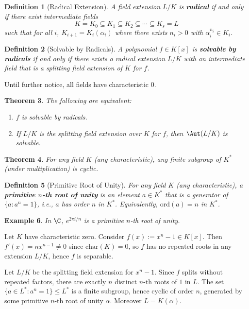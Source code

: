 \documentclass[a4paper,12pt]{article}
\newtheorem{thm}{Theorem}[section]
\newtheorem{defn}[thm]{Definition}
\newtheorem{eg}[thm]{Example}
\begin{document}
\begin{defn}[Radical Extension]
    A field extension $L/K$ is \textbf{radical} if and only if there exist intermediate fields
    \[
    K=K_0\subseteq K_1\subseteq K_2\subseteq \cdots \subseteq K_s=L
    \]
    such that for all $i$, $K_{i+1}=K_i(\alpha_i)$ where there exists $n_i>0$ with $\alpha_i^{n_i}\in K_i$.
\end{defn}

\begin{defn}[Solvable by Radicals]
    A polynomial $f\in K[x]$ is \textbf{solvable by radicals} if and only if there exists a radical extension $L/K$ with an intermediate field that is a splitting field extension of $K$ for $f$.
\end{defn}

Until further notice, all fields have characteristic $0$.

\begin{thm}
    The following are equivalent:
    \begin{enumerate}
        \item $f$ is solvable by radicals.
        \item If $L/K$ is the splitting field extension over $K$ for $f$, then $\Aut(L/K)$ is solvable.
    \end{enumerate}
\end{thm}

\begin{thm}
    For any field $K$ (any characteristic), any finite subgroup of $K^*$ (under multiplication) is cyclic.
\end{thm}

\begin{defn}[Primitive Root of Unity]
    For any field $K$ (any characteristic), a \textbf{primitive $n$-th root of unity} is an element $a\in K^*$ that is a generator of $\{a : a^n=1\}$, i.e., $a$ has order $n$ in $K^*$. Equivalently, $\mathrm{ord}(a)=n$ in $K^*$.
\end{defn}

\begin{eg}
    In $\C$, $e^{2\pi i/n}$ is a primitive $n$-th root of unity.
\end{eg}

Let $K$ have characteristic zero. Consider $f(x):=x^n-1\in K[x]$. Then $f'(x)=nx^{n-1}\neq 0$ since $\mathrm{char}(K)=0$, so $f$ has no repeated roots in any extension $L/K$, hence $f$ is separable.

Let $L/K$ be the splitting field extension for $x^n-1$. Since $f$ splits without repeated factors, there are exactly $n$ distinct $n$-th roots of $1$ in $L$. The set $\{a\in L^*: a^n=1\}\leq L^*$ is a finite subgroup, hence cyclic of order $n$, generated by some primitive $n$-th root of unity $\alpha$. Moreover $L=K(\alpha)$.
\end{document}
